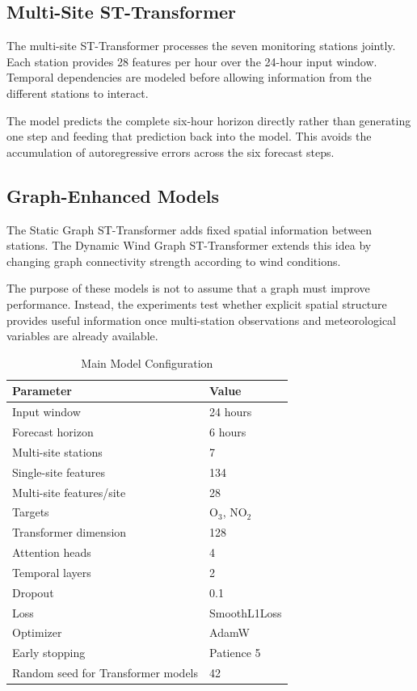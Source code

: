 \documentclass[conference]{IEEEtran}
\begin{document}
\subsection{Multi-Site ST-Transformer}

The multi-site ST-Transformer processes the seven monitoring stations jointly. Each station
provides 28 features per hour over the 24-hour input window. Temporal dependencies are modeled
before allowing information from the different stations to interact.

The model predicts the complete six-hour horizon directly rather than generating one step and
feeding that prediction back into the model. This avoids the accumulation of autoregressive
errors across the six forecast steps.

\subsection{Graph-Enhanced Models}

The Static Graph ST-Transformer adds fixed spatial information between stations. The Dynamic
Wind Graph ST-Transformer extends this idea by changing graph connectivity strength according
to wind conditions.

The purpose of these models is not to assume that a graph must improve performance. Instead,
the experiments test whether explicit spatial structure provides useful information once
multi-station observations and meteorological variables are already available.

\begin{table}[htbp]
\centering
\caption{Main Model Configuration}
\label{tab:hyper}
\begin{tabular}{p{} p{}}
\toprule
\textbf{Parameter} & \textbf{Value} \\
\midrule
Input window & 24 hours \\
Forecast horizon & 6 hours \\
Multi-site stations & 7 \\
Single-site features & 134 \\
Multi-site features/site & 28 \\
Targets & O$_3$, NO$_2$ \\
Transformer dimension & 128 \\
Attention heads & 4 \\
Temporal layers & 2 \\
Dropout & 0.1 \\
Loss & SmoothL1Loss \\
Optimizer & AdamW \\
Early stopping & Patience 5 \\
Random seed for Transformer models & 42 \\
\bottomrule
\end{tabular}
\end{table}
\end{document}
